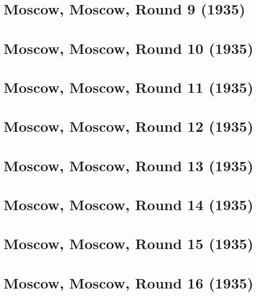 \documentclass[11pt]{article}
\begin{document}
\clearpage

\section{Moscow, Moscow, Round 9 (1935)}


\clearpage

\section{Moscow, Moscow, Round 10 (1935)}


\clearpage

\section{Moscow, Moscow, Round 11 (1935)}


\clearpage

\section{Moscow, Moscow, Round 12 (1935)}


\clearpage

\section{Moscow, Moscow, Round 13 (1935)}


\clearpage

\section{Moscow, Moscow, Round 14 (1935)}


\clearpage

\section{Moscow, Moscow, Round 15 (1935)}


\clearpage

\section{Moscow, Moscow, Round 16 (1935)}


\clearpage
\end{document}
